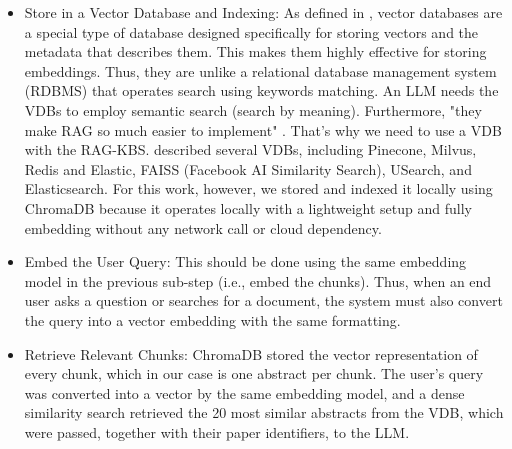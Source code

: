 \documentclass[bdcc,article,submit,pdftex,moreauthors]{Definitions/mdpi}
\newif\ifshowchanges
\newcommand{\commentRed}[1]{\textcolor{red}{#1}}
\newcommand{\commentGN}[1]{\textcolor{olive}{\textbf{GC:} #1}}
\newif\ifshowchanges
\begin{document}
\begin{itemize}
    \item Store in a Vector Database and Indexing: As defined in \cite{brousseau2025llms}, vector databases are a special type of database designed specifically for storing vectors and the metadata that describes them. This makes them highly effective for storing embeddings. Thus, they are unlike a relational database management system (RDBMS) that operates search using keywords matching. An LLM needs the VDBs to employ semantic search (search by meaning). Furthermore, "they make RAG so much easier to implement" \cite{brousseau2025llms}.  That's why we need to use a VDB with the RAG-KBS. \citet{brousseau2025llms} described several VDBs, including Pinecone, Milvus, Redis and Elastic, FAISS (Facebook AI Similarity Search), USearch, and Elasticsearch. For this work, however, we stored and indexed it locally using ChromaDB because it operates locally with a lightweight setup and fully embedding  without any network call or cloud dependency. %
    
    \item Embed the User Query: This should be done using the same embedding model in the previous sub-step (i.e., embed the chunks). Thus, when an end user asks a question or searches for a document, the system must also convert the query into a vector embedding with the same formatting.
    \item Retrieve Relevant Chunks: ChromaDB stored the vector representation of every chunk, which in our case is one abstract per chunk. The user's query was converted into a vector by the same embedding model, and a dense similarity search retrieved the 20 most similar abstracts from the VDB, which were passed, together with their paper identifiers, to the LLM.
  
    

\end{itemize}
\end{document}
